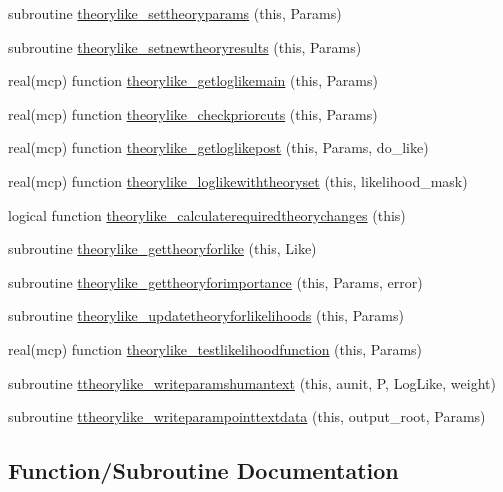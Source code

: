 \begin{DoxyCompactItemize}
\item 
subroutine \mbox{\hyperlink{namespacecalclike_ab9d66863dbce892dbee08483d9cdac50}{theorylike\+\_\+settheoryparams}} (this, Params)
\item 
subroutine \mbox{\hyperlink{namespacecalclike_a3823367d787d17f15e903222232f4b94}{theorylike\+\_\+setnewtheoryresults}} (this, Params)
\item 
real(mcp) function \mbox{\hyperlink{namespacecalclike_a141801e2c0e794a0411104bca9bb6809}{theorylike\+\_\+getloglikemain}} (this, Params)
\item 
real(mcp) function \mbox{\hyperlink{namespacecalclike_adffdc491632ae303d023f5e1b704eba4}{theorylike\+\_\+checkpriorcuts}} (this, Params)
\item 
real(mcp) function \mbox{\hyperlink{namespacecalclike_a27e62cb96ad63d0285283d1eb8dcec0c}{theorylike\+\_\+getloglikepost}} (this, Params, do\+\_\+like)
\item 
real(mcp) function \mbox{\hyperlink{namespacecalclike_a81e2854f62abdf354c1f03fc29c05d1c}{theorylike\+\_\+loglikewiththeoryset}} (this, likelihood\+\_\+mask)
\item 
logical function \mbox{\hyperlink{namespacecalclike_ae7eb4423ffdbadbf2df406b9d3331346}{theorylike\+\_\+calculaterequiredtheorychanges}} (this)
\item 
subroutine \mbox{\hyperlink{namespacecalclike_ab2d52ca5a668e5072ed6d10c161a5e88}{theorylike\+\_\+gettheoryforlike}} (this, Like)
\item 
subroutine \mbox{\hyperlink{namespacecalclike_ab57c11043f079701db0baf858bf6315a}{theorylike\+\_\+gettheoryforimportance}} (this, Params, error)
\item 
subroutine \mbox{\hyperlink{namespacecalclike_adb244129926744248e4e4f8883384b5c}{theorylike\+\_\+updatetheoryforlikelihoods}} (this, Params)
\item 
real(mcp) function \mbox{\hyperlink{namespacecalclike_adb2986867dcdb441b12b98cdd46cc5b5}{theorylike\+\_\+testlikelihoodfunction}} (this, Params)
\item 
subroutine \mbox{\hyperlink{namespacecalclike_a5c185d1a702fe31d3d1204d919b338da}{ttheorylike\+\_\+writeparamshumantext}} (this, aunit, P, Log\+Like, weight)
\item 
subroutine \mbox{\hyperlink{namespacecalclike_acb1cb4737fc9ec3a805214e87b444b00}{ttheorylike\+\_\+writeparampointtextdata}} (this, output\+\_\+root, Params)
\end{DoxyCompactItemize}


\subsection{Function/\+Subroutine Documentation}
\mbox{\label{namespacecalclike_a36076b04960c7a7230a45fc468f9f0d6}} 
